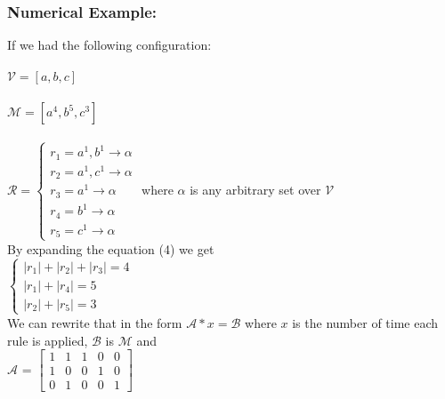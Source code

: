 \documentclass[runningheads]{llncs}
\begin{document}
\subsubsection*{ Numerical Example:} 
If we had the following configuration: \\ \\
 $\mathcal{V} = [a,b,c]$ \\ \\ $\mathcal{M} = [a^4,b^5,c^3]$ \\  \\ $ \mathcal{R} = \begin{cases} r_1 = a^1,b^1 \rightarrow \alpha \\  r_2 = a^1,c^1 \rightarrow \alpha \\  r_3 = a^1 \rightarrow \alpha \\  r_4 = b^1 \rightarrow \alpha \\  r_5 = c^1 \rightarrow \alpha  \end{cases} $  
where $\alpha$ is any arbitrary set over $\mathcal{V}$ \\[3ex]
By expanding the equation (4) we get \\[3ex]
$ \begin{cases} |r_1| + |r_2| + |r_3| = 4 \\ |r_1| + |r_4| =5 \\ |r_2| + |r_5| = 3 \end{cases} $ \\[3ex]
We can rewrite that in the form  $\mathcal{A} * x = \mathcal{B}$ where $x$ is the number of time each rule is applied, $\mathcal{B}$ is $\mathcal{M}$ and  \\[3ex]
$\mathcal{A}$ = $ \begin{bmatrix} 1 & 1 & 1 & 0 & 0 \\ 1 & 0 & 0 & 1 & 0 \\ 0 & 1 & 0 & 0 & 1 \end{bmatrix} $ \\
\end{document}
